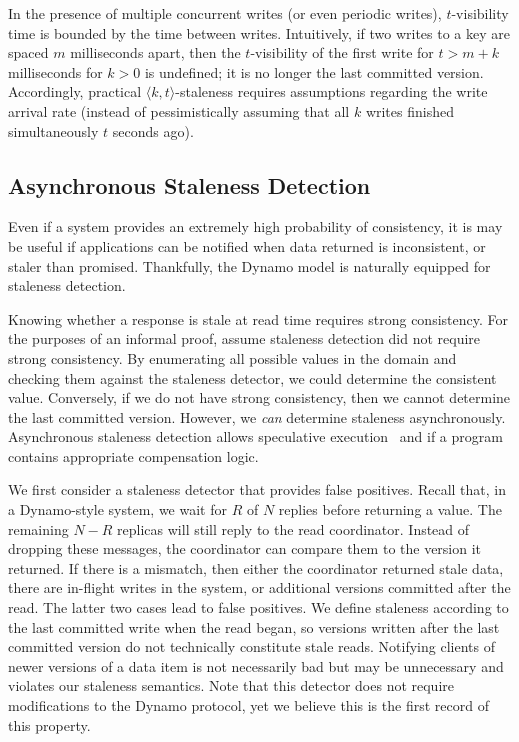 \documentclass{vldb}
\begin{document}
In the presence of multiple concurrent writes (or even periodic
writes), $t$-visibility time is bounded by the time between writes.
Intuitively, if two writes to a key are spaced $m$ milliseconds apart,
then the $t$-visibility of the first write for $t > m+k$ milliseconds
for $k >0$ is undefined; it is no longer the last committed version.
Accordingly, practical $\langle k, t \rangle$-staleness requires
assumptions regarding the write arrival rate (instead of
pessimistically assuming that all $k$ writes finished simultaneously
$t$ seconds ago).

\subsection{Asynchronous Staleness Detection}

Even if a system provides an extremely high probability of
consistency, it is may be useful if applications can be notified when
data returned is inconsistent, or staler than promised.  Thankfully,
the Dynamo model is naturally equipped for staleness detection.

Knowing whether a response is stale at read time requires strong
consistency.  For the purposes of an informal proof, assume staleness
detection did not require strong consistency.  By enumerating all
possible values in the domain and checking them against the staleness
detector, we could determine the consistent value.  Conversely, if we
do not have strong consistency, then we cannot determine the last
committed version. However, we \textit{can} determine staleness
asynchronously.  Asynchronous staleness detection allows speculative
execution~\cite{nsdispeculation} and if a program contains appropriate
compensation logic.

We first consider a staleness detector that provides false positives.
Recall that, in a Dynamo-style system, we wait for $R$ of $N$ replies
before returning a value.  The remaining $N-R$ replicas will still
reply to the read coordinator.  Instead of dropping these messages,
the coordinator can compare them to the version it returned.  If there
is a mismatch, then either the coordinator returned stale data, there
are in-flight writes in the system, or additional versions committed
after the read.  The latter two cases lead to false positives.  We
define staleness according to the last committed write when the read
began, so versions written after the last committed version do not
technically constitute stale reads.  Notifying clients of newer
versions of a data item is not necessarily bad but may be unnecessary
and violates our staleness semantics.  Note that this detector does
not require modifications to the Dynamo protocol, yet we believe this
is the first record of this property.
\end{document}
